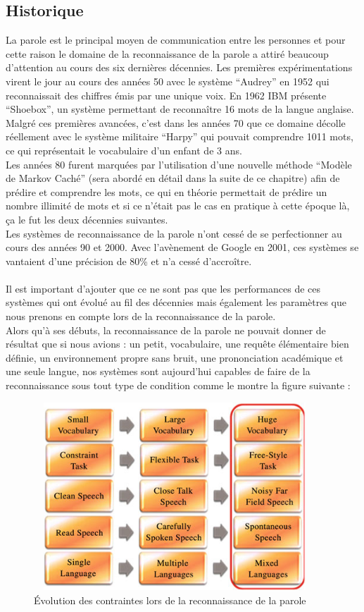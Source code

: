 \subsection{Historique}
La parole est le principal moyen de communication entre les personnes et pour cette raison le domaine de la reconnaissance de la parole a attiré beaucoup d’attention au cours des six dernières décennies. Les premières expérimentations virent le jour au cours des années 50 avec le système “Audrey” en 1952 qui reconnaissait des chiffres émis par une unique voix. En 1962 IBM présente “Shoebox”, un système permettant de reconnaître 16 mots de la langue anglaise.\\
Malgré ces premières avancées, c’est dans les années 70 que ce domaine décolle réellement avec le système militaire “Harpy” qui pouvait comprendre  1011 mots, ce qui représentait le vocabulaire d’un enfant de 3 ans.\\
Les années 80 furent marquées par l’utilisation d’une nouvelle méthode “Modèle de Markov Caché” (sera abordé en détail dans la suite de ce chapitre) afin de prédire et comprendre les mots, ce qui en théorie permettait de prédire un nombre illimité de mots et si ce n'était pas le cas en pratique à cette époque là, ça le fut les deux décennies suivantes.\cite{speechrechist}
\\
Les systèmes de reconnaissance de la parole n’ont cessé de se perfectionner au cours des années 90 et 2000. Avec l'avènement de Google en 2001, ces systèmes se vantaient d’une précision de 80\% et n’a cessé d'accroître.\cite{audreysiri}
\\ \\Il est important d'ajouter que ce ne sont pas que les performances de ces systèmes qui ont évolué au fil des décennies mais également les paramètres que nous prenons en compte lors de la reconnaissance de la parole.\\
Alors qu'à ses débuts, la reconnaissance de la parole ne pouvait donner de résultat que si nous avions : un petit, vocabulaire, une requête élémentaire bien définie, un environnement propre sans bruit, une prononciation académique et une seule langue, nos systèmes sont aujourd'hui capables de faire de la reconnaissance sous tout type de condition comme le montre la figure suivante : 

\begin{figure}[H]
    \centering
    \includegraphics[height=200pt,width=300pt]{images/chap1/evolution.png}
    \caption{Évolution des contraintes lors de la reconnaissance de la parole\cite{deeplearningapproach}}
\end{figure}

